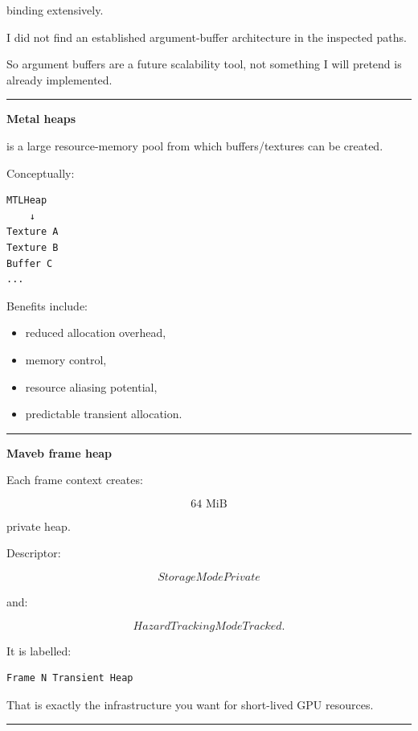 binding extensively.

I did not find an established argument-buffer architecture in the inspected paths.

So argument buffers are a future scalability tool, not something I will pretend is already implemented.

\begin{center}\rule{0.5\linewidth}{0.5pt}\end{center}

\textbf{Metal heaps}

 is a large resource-memory pool from which buffers/textures can be created.

Conceptually:

\begin{verbatim}
MTLHeap
    ↓
Texture A
Texture B
Buffer C
...
\end{verbatim}

Benefits include:

\begin{itemize}
\tightlist
\item
  reduced allocation overhead,
\item
  memory control,
\item
  resource aliasing potential,
\item
  predictable transient allocation.
\end{itemize}

\begin{center}\rule{0.5\linewidth}{0.5pt}\end{center}

\textbf{Maveb frame heap}

Each frame context creates:

\[
64\text{ MiB}
\]

private heap.

Descriptor:

\[
StorageModePrivate
\]

and:

\[
HazardTrackingModeTracked.
\]

It is labelled:

\begin{verbatim}
Frame N Transient Heap
\end{verbatim}

That is exactly the infrastructure you want for short-lived GPU resources.

\begin{center}\rule{0.5\linewidth}{0.5pt}\end{center}

